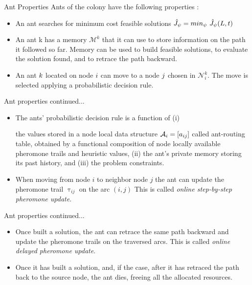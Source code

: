 \documentclass[table]{beamer}
\begin{document}
\begin{frame}{Ant Properties}
	Ants of the colony have the following properties :
	\begin{itemize}
		\item<1-> An ant searches for minimum cost feasible solutions 
		$\hat{\mathnormal{J}}_{\psi} =  \mathnormal{min_{\psi}} \  \hat{\mathnormal{J}}_{\psi}(\mathnormal{L},\mathnormal{t}) $ 
			
		
		\item<2-> An ant k has a memory $ \mathcal{M}^{k} $ that it can use to store
information on the path it followed so far. Memory
can be used to build feasible solutions, to evaluate the
solution found, and to retrace the path backward.

		\item<3-> An ant $ \mathnormal{k} $ located on node $ \mathnormal{i} $ can move to a node $ \mathnormal{j} $ chosen in $ \mathcal{N}_{i}^{k} $. The move is selected applying a probabilistic
		decision rule.
	\end{itemize}
\end{frame}	

\begin{frame}{Ant properties continued...}
     \begin{itemize}
		\item<1-> The ants’ probabilistic decision rule is a function of (i)

		the values stored in a node local data structure $\mathcal{A}_i = [ \mathnormal{{a}_{ij} } ] $ called ant-routing table, obtained by a functional composition of node locally available pheromone trails
		and heuristic values, (ii) the ant’s private memory storing its past history, and (iii) the problem constraints.
		
		\item<2-> When moving from node $i$ to neighbor node $j$ the ant can update the pheromone trail $ \uptau_{ij} $  on the arc $(i, j)$ This is called \emph{online step-by-step pheromone update}.
		
	\end{itemize}
\end{frame}



\begin{frame}{Ant properties continued...}
	\begin{itemize}
		\item<1-> Once built a solution, the ant can retrace the same path
		backward and update the pheromone trails on the traversed arcs. This is called \emph{online delayed pheromone update}.
		
		\item<2-> Once it has built a solution, and, if the case, after it has retraced the path back to the source node, the ant dies, freeing all the allocated resources.
		
	\end{itemize}
\end{frame}
\end{document}
